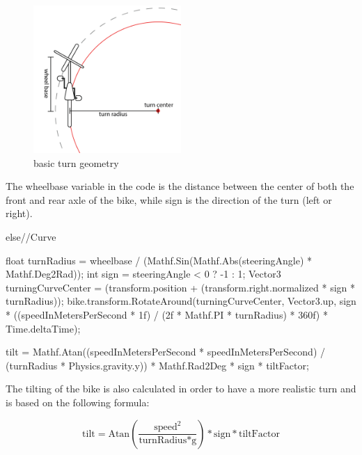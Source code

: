 \documentclass[english,notitlepage,smartquotes]{hgbreport}
\begin{document}
\begin{figure}[h]
	\centering
	\includegraphics[width=0.5\textwidth]{images/turningDiagram.png}
	\caption{basic turn geometry}
\end{figure}

The wheelbase variable in the code is the distance between the center of both the front and rear axle of the bike, while sign is the direction of the turn (left or right).
\begin{CsCode}
else//Curve
	{
		float turnRadius = wheelbase / (Mathf.Sin(Mathf.Abs(steeringAngle) * Mathf.Deg2Rad));
		int sign = steeringAngle < 0 ? -1 : 1;
		Vector3 turningCurveCenter = (transform.position + (transform.right.normalized * sign * turnRadius));
		bike.transform.RotateAround(turningCurveCenter, Vector3.up, sign * ((speedInMetersPerSecond * 1f) / (2f * Mathf.PI * turnRadius) * 360f) * Time.deltaTime);

		tilt = Mathf.Atan((speedInMetersPerSecond * speedInMetersPerSecond) / (turnRadius * Physics.gravity.y)) * Mathf.Rad2Deg * sign * tiltFactor;
	}
\end{CsCode}
The tilting of the bike is also calculated in order to have a more realistic turn and is based on the following formula:

\begin{equation}
\text{tilt} = \text{Atan}(\frac{\text{speed}^2}{\text{turnRadius} * \text{g}}) * \text{sign} * \text{tiltFactor}
\end{equation}
\end{document}
